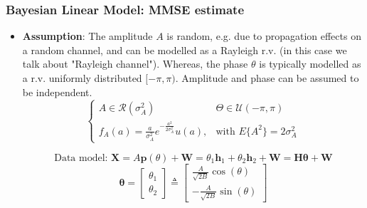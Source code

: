 \subsubsection{Bayesian Linear Model: MMSE estimate}
\begin{itemize}
    \item \textbf{Assumption}: The amplitude \(A\) is random, e.g. due to propagation effects on a random channel, and can be modelled as a Rayleigh r.v. (in this case we talk about "Rayleigh channel"). Whereas, the phase \(\theta\) is typically modelled as a r.v. uniformly distributed \([-\pi,\pi)\). Amplitude and phase can be assumed to be independent.
 \[   \begin{cases}
A \in \mathcal{R}(\sigma_{A}^{2}) & \Theta \in \mathcal{U}(-\pi, \pi) \\
f_{A}(a) = \frac{a}{\sigma_{A}^{2}} e^{-\frac{a^{2}}{2\sigma_{A}^{2}}}u(a), & \text{with } E\{A^{2}\} = 2\sigma_{A}^{2}
\end{cases}\]

\[
\text{Data model: } \mathbf{X} = A\mathbf{p}(\theta) + \mathbf{W} = \theta_{1}\mathbf{h}_{1} + \theta_{2}\mathbf{h}_{2} + \mathbf{W} = \mathbf{H}\boldsymbol{\theta} + \mathbf{W} \]
\[
\boldsymbol{\theta} = \begin{bmatrix} \theta_{1} \\ \theta_{2} \end{bmatrix} \triangleq \begin{bmatrix} \frac{A}{\sqrt{2B}}\cos(\theta) \\ -\frac{A}{\sqrt{2B}}\sin(\theta) \end{bmatrix}
\]


\end{itemize}

